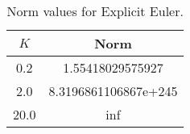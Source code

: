 \begin{table}[htbp]
	 \centering
	 \caption{Norm values for Explicit Euler.}
	 \begin{tabular}{cc}
		 \toprule
		 $K$ & Norm \\ 
		 \midrule 
		 0.2 & 1.55418029575927 \\ 
		 2.0 & 8.3196861106867e+245 \\ 
		 20.0 & inf \\ 
		 \bottomrule 
	 \end{tabular} 
	 \label{tab:error ee} 
\end{table}